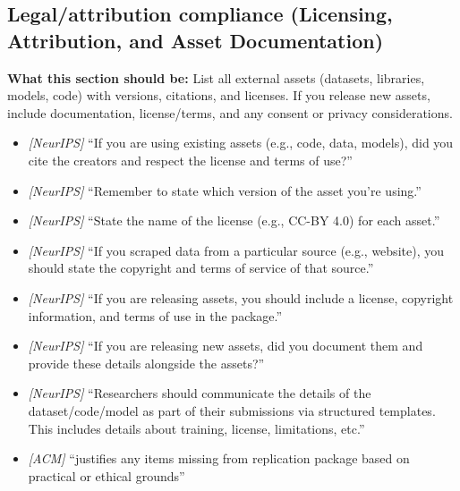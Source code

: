 \documentclass[11pt]{article}
\begin{document}
\subsection{Legal/attribution compliance (Licensing, Attribution, and Asset Documentation)}
\noindent\textbf{What this section should be:}
List all external assets (datasets, libraries, models, code) with versions, citations, and licenses. If you release new assets, include documentation, license/terms, and any consent or privacy considerations.
\begin{itemize}
  \item \textit{[NeurIPS]} ``If you are using existing assets (e.g., code, data, models), did you cite the creators and respect the license and terms of use?''
  \item \textit{[NeurIPS]} ``Remember to state which version of the asset you're using.''
  \item \textit{[NeurIPS]} ``State the name of the license (e.g., CC-BY 4.0) for each asset.''
  \item \textit{[NeurIPS]} ``If you scraped data from a particular source (e.g., website), you should state the copyright and terms of service of that source.''
  \item \textit{[NeurIPS]} ``If you are releasing assets, you should include a license, copyright information, and terms of use in the package.''
  \item \textit{[NeurIPS]} ``If you are releasing new assets, did you document them and provide these details alongside the assets?''
  \item \textit{[NeurIPS]} ``Researchers should communicate the details of the dataset/code/model as part of their submissions via structured templates. This includes details about training, license, limitations, etc.''
  \item \textit{[ACM]} ``justifies any items missing from replication package based on practical or ethical grounds''
\end{itemize}
\end{document}
